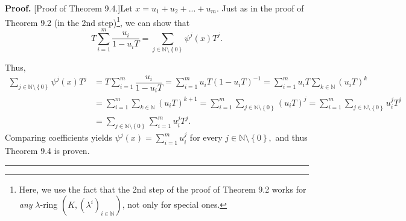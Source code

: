\documentclass[numbers=enddot,12pt,final,onecolumn,notitlepage]{scrartcl}%
\newenvironment{proof}[1][Proof]{\noindent\textbf{#1.} }{\ \rule{0.5em}{0.5em}}
\begin{document}
\begin{proof}
[Proof of Theorem 9.4.]Let $x=u_{1}+u_{2}+...+u_{m}$. Just as in the proof of
Theorem 9.2 (in the 2nd step)\footnote{Here, we use the fact that the 2nd step
of the proof of Theorem 9.2 works for \textit{any} $\lambda$-ring $\left(
K,\left(  \lambda^{i}\right)  _{i\in\mathbb{N}}\right)  $, not only for
special ones.}, we can show that%
\[
T\sum\limits_{i=1}^{m}\dfrac{u_{i}}{1-u_{i}T}=\sum\limits_{j\in\mathbb{N}%
\setminus\left\{  0\right\}  }\psi^{j}\left(  x\right)  T^{j}.
\]


Thus,%
\begin{align*}
\sum\limits_{j\in\mathbb{N}\setminus\left\{  0\right\}  }\psi^{j}\left(
x\right)  T^{j}  &  =T\sum\limits_{i=1}^{m}\dfrac{u_{i}}{1-u_{i}T}%
=\sum\limits_{i=1}^{m}u_{i}T\left(  1-u_{i}T\right)  ^{-1}=\sum\limits_{i=1}%
^{m}u_{i}T\sum_{k\in\mathbb{N}}\left(  u_{i}T\right)  ^{k}\\
&  =\sum\limits_{i=1}^{m}\sum_{k\in\mathbb{N}}\left(  u_{i}T\right)
^{k+1}=\sum\limits_{i=1}^{m}\sum_{j\in\mathbb{N}\setminus\left\{  0\right\}
}\left(  u_{i}T\right)  ^{j}=\sum\limits_{i=1}^{m}\sum_{j\in\mathbb{N}%
\setminus\left\{  0\right\}  }u_{i}^{j}T^{j}\\
&  =\sum_{j\in\mathbb{N}\setminus\left\{  0\right\}  }\sum\limits_{i=1}%
^{m}u_{i}^{j}T^{j}.
\end{align*}
Comparing coefficients yields $\psi^{j}\left(  x\right)  =\sum\limits_{i=1}%
^{m}u_{i}^{j}$ for every $j\in\mathbb{N}\setminus\left\{  0\right\}  ,$ and
thus Theorem 9.4 is proven.
\end{proof}
\end{document}
